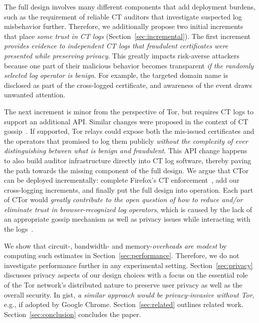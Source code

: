 The full design involves many different components that add deployment burdens,
such as the requirement of reliable CT auditors that investigate suspected log
misbehavior further.  Therefore, we additionally propose two initial increments
that place \emph{some trust in CT logs} (Section~\ref{sec:incremental}).  The
first increment \emph{provides evidence to independent CT logs that fraudulent
certificates were presented while preserving privacy}.  This greatly impacts
risk-averse attackers because one part of their malicious behavior becomes
transparent \emph{if the randomly selected log operator is benign}.  For
example, the targeted domain name is disclosed as part of the cross-logged
certificate, and awareness of the event draws unwanted attention.

The next increment is minor from the perspective of Tor, but requires CT logs to
support an additional API.  Similar changes were proposed in the context of CT
gossip~\cite{minimal-gossip}.  If supported, Tor relays could expose both the
mis-issued certificates and the operators that promised to log them publicly
\emph{without the complexity of ever distinguishing between what is benign and
fraudulent}.
This API change happens to also build auditor infrastructure
directly into CT log software, thereby paving the path towards the missing component of
the full design.  We argue that CTor can be deployed incrementally:
	complete Firefox's CT enforcement~\cite{ffct},
	add our cross-logging increments, and
	finally put the full design into operation.
Each part of CTor would \emph{greatly contribute to the open question of how
to reduce and/or eliminate trust in browser-recognized log operators}, which is
caused by the lack of an appropriate gossip mechanism as well as privacy issues
while interacting with the logs~\cite{minimal-gossip,nordberg,ct-with-privacy}.

We show that circuit-, bandwidth- and memory-\emph{overheads are modest} by
computing such estimates in Section~\ref{sec:performance}.  Therefore, we do not
investigate performance further in any experimental setting.
Section~\ref{sec:privacy} discusses privacy aspects of our design choices with
a focus on the essential role of the Tor network's distributed nature to
preserve user privacy as well as the overall security.  In gist,
\emph{a similar approach would be privacy-invasive without Tor}, e.g., if
adopted by Google Chrome.  Section~\ref{sec:related} outlines related work.
Section~\ref{sec:conclusion} concludes the paper.
